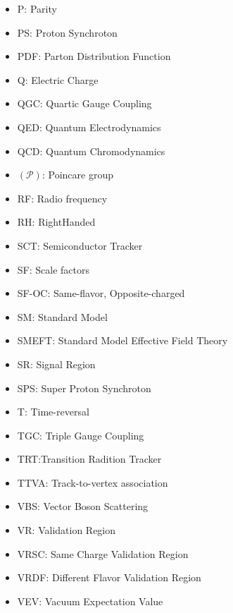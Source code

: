 \begin{itemize}
\item{P: Parity}
\item{PS: Proton Synchroton}
\item{PDF: Parton Distribution Function}
\item{Q: Electric Charge}
\item{QGC: Quartic Gauge Coupling}
\item{QED: Quantum Electrodynamics}
\item{QCD: Quantum Chromodynamics}
\item{$(\mathcal{P})$: Poincare group}
\item{RF: Radio frequency}
\item{RH: RightHanded}
\item{SCT: Semiconductor Tracker} 
\item{SF: Scale factors}
\item{SF-OC: Same-flavor, Opposite-charged} 
\item{SM: Standard Model}
\item{SMEFT: Standard Model Effective Field Theory} 
\item{SR: Signal Region}
\item{SPS: Super Proton Synchroton} 
\item{T: Time-reversal}
\item{TGC: Triple Gauge Coupling}
\item{TRT:Transition Radition Tracker} 
\item{TTVA: Track-to-vertex association}
\item{VBS: Vector Boson Scattering}
\item{VR: Validation Region}
\item{VRSC: Same Charge Validation Region}
\item{VRDF: Different Flavor Validation Region}
\item{VEV: Vacuum Expectation Value}
\end{itemize}

